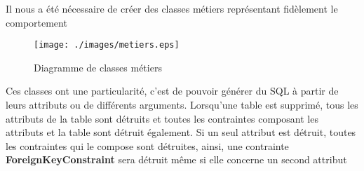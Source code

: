 \subtitle{Les classes métiers}
Il nous a été nécessaire de créer des classes métiers représentant fidèlement le comportement 

\begin{figure}[!h]
\centering
\texttt{[image: ./images/metiers.eps]}
\caption{Diagramme de classes métiers}
\label{classes_metiers}
\end{figure}


Ces classes ont une particularité, c'est de pouvoir générer du SQL à partir de leurs attributs ou de différents arguments.
Lorsqu'une table est supprimé, tous les attributs de la table sont détruits et toutes les contraintes composant les attributs et la table sont détruit également.
Si un seul attribut est détruit, toutes les contraintes qui le compose sont détruites, ainsi, une contrainte \textbf{ForeignKeyConstraint} sera détruit même si elle concerne un second attribut
